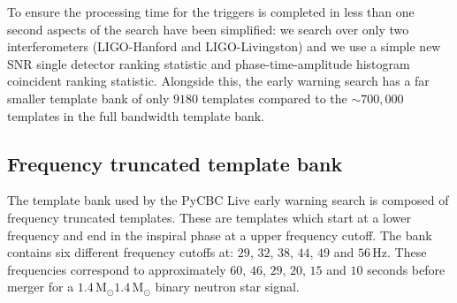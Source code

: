To ensure the processing time for the triggers is completed in less than one second aspects of the search have been simplified: we search over only two interferometers (LIGO-Hanford and LIGO-Livingston) and we use a simple new SNR single detector ranking statistic and phase-time-amplitude histogram coincident ranking statistic. Alongside this, the early warning search has a far smaller template bank of only $9180$ templates compared to the ${\sim}700,000$ templates in the full bandwidth template bank.

\subsection{\label{6:sec:early-warning-template-bank}Frequency truncated template bank}

The template bank used by the PyCBC Live early warning search is composed of frequency truncated templates. These are \gwadj templates which start at a lower frequency and end in the inspiral phase at a upper frequency cutoff. The bank contains six different frequency cutoffs at: $29$, $32$, $38$, $44$, $49$ and $56 \, \text{Hz}$. These frequencies correspond to approximately $60$, $46$, $29$, $20$, $15$ and $10$ seconds before merger for a $1.4 \, \text{M$_\odot$}$\text{--}$1.4\, \text{M$_\odot$}$ binary neutron star signal.

